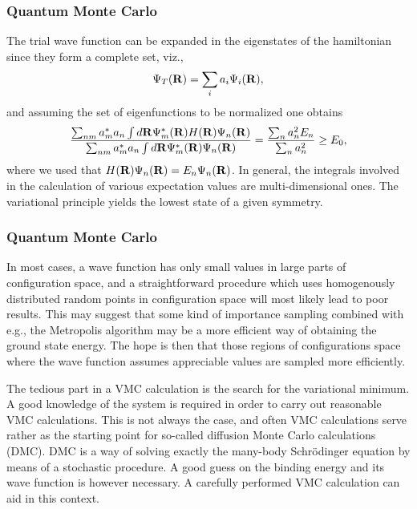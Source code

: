 \documentclass[compress]{beamer}
\begin{document}
\frame
{
  \frametitle{Quantum Monte Carlo}
\begin{small}
{\scriptsize
The trial wave function can be expanded
in the eigenstates of the hamiltonian since they form a complete set, viz.,
\[
   \Psi_T({\bf R})=\sum_i a_i\Psi_i({\bf R}),
\]
and assuming the set of eigenfunctions to be normalized one obtains 
\[
     \frac{\sum_{nm}a^*_ma_n \int d{\bf R}\Psi^{\ast}_m({\bf R})H({\bf R})\Psi_n({\bf R})}
        {\sum_{nm}a^*_ma_n \int d{\bf R}\Psi^{\ast}_m({\bf R})\Psi_n({\bf R})} =\frac{\sum_{n}a^2_n E_n}
        {\sum_{n}a^2_n} \ge E_0,
\]
where we used that $H({\bf R})\Psi_n({\bf R})=E_n\Psi_n({\bf R})$.
In general, the integrals involved in the calculation of various  expectation
values  are multi-dimensional ones. 
The variational principle yields the lowest state of a given symmetry.
}
\end{small}
}


\frame
{
  \frametitle{Quantum Monte Carlo}
\begin{small}
{\scriptsize
In most cases, a wave function has only small values in large parts of 
configuration space, and a straightforward procedure which uses
homogenously distributed random points in configuration space 
will most likely lead to poor results. This may suggest that some kind
of importance sampling combined with e.g., the Metropolis algorithm 
may be  a more efficient way of obtaining the ground state energy.
The hope is then that those regions of configurations space where
the wave function assumes appreciable values are sampled more 
efficiently. 

The tedious part in a VMC calculation is the search for the variational
minimum. A good knowledge of the system is required in order to carry out
reasonable VMC calculations. This is not always the case, 
and often VMC calculations 
serve rather as the starting
point for so-called diffusion Monte Carlo calculations (DMC). DMC is a way of
solving exactly the many-body Schr\"odinger equation by means of 
a stochastic procedure. A good guess on the binding energy
and its wave function is however necessary. 
A carefully performed VMC calculation can aid in this context. 
}
\end{small}
}
\end{document}
